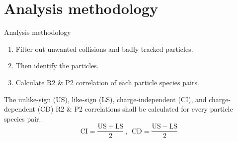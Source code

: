 \documentclass{beamer}
\begin{document}
\section{Analysis methodology}
\begin{frame}{Analysis methodology}
	\begin{enumerate}
		\item Filter out unwanted collisions and badly tracked particles.
		\item Then identify the particles.
		\item Calculate R2 \& P2 correlation of each particle species pairs.
	\end{enumerate}
\vspace*{0.5in}
	The unlike-sign (US), like-sign (LS), charge-independent (CI), and charge-dependent (CD) R2 \& P2 correlations shall be calculated for every particle species pair.
	\[\mathrm{CI}=\frac{\mathrm{US}+\mathrm{LS}}{2}\ , \ \ \mathrm{CD}=\frac{\mathrm{US}-\mathrm{LS}}{2}\]
\end{frame}
\end{document}
